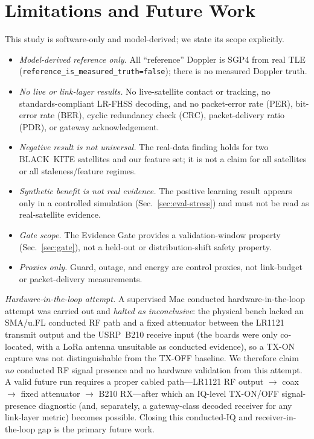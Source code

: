 \documentclass[conference]{IEEEtran}
\begin{document}
\section{Limitations and Future Work}
\label{sec:limits}

This study is software-only and model-derived; we state its scope explicitly.
\begin{itemize}
\item \emph{Model-derived reference only.} All ``reference'' Doppler is SGP4 from
  real TLE (\texttt{reference\_is\_measured\_truth=false}); there is no measured
  Doppler truth.
\item \emph{No live or link-layer results.} No live-satellite contact or tracking,
  no standards-compliant LR-FHSS decoding, and no packet-error rate (PER),
  bit-error rate (BER), cyclic redundancy check (CRC), packet-delivery ratio
  (PDR), or gateway acknowledgement.
\item \emph{Negative result is not universal.} The real-data finding holds for two
  BLACK~KITE satellites and our feature set; it is not a claim for all satellites
  or all staleness/feature regimes.
\item \emph{Synthetic benefit is not real evidence.} The positive learning result
  appears only in a controlled simulation (Sec.~\ref{sec:eval-stress}) and must
  not be read as real-satellite evidence.
\item \emph{Gate scope.} The Evidence Gate provides a validation-window property
  (Sec.~\ref{sec:gate}), not a held-out or distribution-shift safety property.
\item \emph{Proxies only.} Guard, outage, and energy are control proxies, not
  link-budget or packet-delivery measurements.
\end{itemize}

\emph{Hardware-in-the-loop attempt.} A supervised Mac conducted hardware-in-the-loop
attempt was carried out and \emph{halted as inconclusive}: the physical bench
lacked an SMA/u.FL conducted RF path and a fixed attenuator between the LR1121
transmit output and the USRP~B210 receive input (the boards were only co-located,
with a LoRa antenna unsuitable as conducted evidence), so a TX-ON capture was not
distinguishable from the TX-OFF baseline. We therefore claim \emph{no} conducted
RF signal presence and no hardware validation from this attempt. A valid future
run requires a proper cabled path---LR1121 RF output $\rightarrow$ coax
$\rightarrow$ fixed attenuator $\rightarrow$ B210 RX---after which an IQ-level
TX-ON/OFF signal-presence diagnostic (and, separately, a gateway-class decoded
receiver for any link-layer metric) becomes possible. Closing this conducted-IQ
and receiver-in-the-loop gap is the primary future work.
\end{document}
